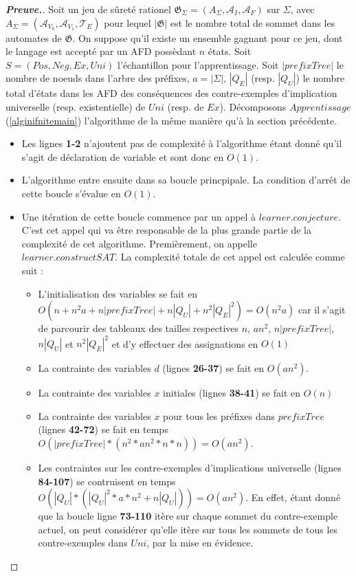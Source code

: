 \documentclass[12pt,a4paper,oneside,titlepage]{report}
\newenvironment{demonstration}{\begin{proof}[\textnormal{\textbf{Preuve.}}]}{\end{proof}}
\begin{document}
\begin{demonstration} Soit un jeu de sûreté rationel $\mathfrak{G}_\Sigma=(A_\Sigma, \mathcal{A}_I, \mathcal{A}_F)$ sur $\Sigma$, avec $A_\Sigma=(\mathcal{A}_{V_0}, \mathcal{A}_{V_1}, \mathcal{T}_E)$ pour lequel $|\mathfrak{G}|$ est le nombre total de sommet dans les automates de $\mathfrak{G}$. On suppose qu'il existe un ensemble gagnant pour ce jeu, dont le langage est accepté par un AFD possèdant $n$ états. Soit $S=(Pos, Neg, Ex, Uni)$ l'échantillon pour l'apprentissage. Soit $|prefixTree|$ le nombre de noeuds dans l'arbre des préfixes, $a=|\Sigma|$, $|Q_E|$ (resp. $|Q_U|$) le nombre total d'états dans les AFD des conséquences des contre-exemples d'implication universelle (resp. existentielle) de $Uni$ (resp. de $Ex$). Décomposons $Apprentissage$ (\ref{alginifnitemain}) l'algorithme de la même manière qu'à la section précédente.
\begin{itemize}
\item Les lignes \textbf{1-2} n'ajoutent pas de complexité à l'algorithme étant donné qu'il s'agit de déclaration de variable et sont donc en $O(1)$.
\item L'algorithme entre ensuite dans sa boucle princpipale. La condition d'arrêt de cette boucle s'évalue en $O(1)$.
\item Une itération de cette boucle commence par un appel à $learner.conjecture$. C'est cet appel qui va être responsable de la plus grande partie de la complexité de cet algorithme. Premièrement, on appelle $learner.constructSAT$. La complexité totale de cet appel est calculée comme suit :
\begin{itemize}
\item L'initialisation des variables se fait en $O(n+n^2a+n|prefixTree|+n|Q_U|+n^2|Q_E|^2)=O(n^2a)$ car il s'agit de parcourir des tableaux des tailles respectives $n$, $an^2$, $n|prefixTree|$, $n|Q_U|$ et $n^2|Q_E|^2$ et d'y effectuer des assignations en $O(1)$
\item La contrainte des variables $d$ (lignes \textbf{26-37}) se fait en $O(an^2)$.
\item La contrainte des variables $x$ initiales (lignes \textbf{38-41}) se fait en $O(n)$
\item La contrainte des variables $x$ pour tous les préfixes dans $prefixTree$ (lignes \textbf{42-72}) se fait en temps $O(|prefixTree|*(n^2*an^2*n*n))=O(an^2)$.
\item Les contraintes sur les contre-exemples d'implications universelle (lignes \textbf{84-107}) se contruisent en temps $O(|Q_U|*(|Q_U|^2*a*n^2+n|Q_U|))=O(an^2)$. En effet, étant donné que la boucle ligne \textbf{73-110} itère sur chaque sommet du contre-exemple actuel, on peut considérer qu'elle itère sur tous les sommets de tous les contre-exemples dans $Uni$, par la mise en évidence.\\

\end{itemize}
\end{itemize}
\end{demonstration}
\end{document}
